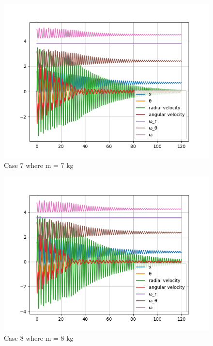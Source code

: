 \begin{figure}[H]
    \centering
    \includegraphics[width=15cm]{SimPictures/m7.png}
    \caption{{Case 7 where m = 7 kg}}
    \label{}
\end{figure}
        
\begin{figure}[H]
    \centering
    \includegraphics[width=15cm]{SimPictures/m8.png}
    \caption{{Case 8 where m = 8 kg}}
    \label{}
\end{figure}
        

